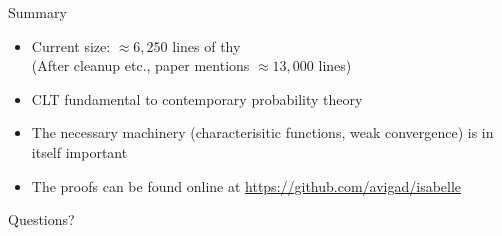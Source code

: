 \documentclass[usepdftitle=false]{beamer}
\begin{document}
\begin{frame}{Summary} %
\begin{itemize}

\item Current size: $\approx 6,250$ lines of thy\\
  (After cleanup etc., paper mentions $\approx 13,000$ lines)

\pause

\item CLT fundamental to contemporary probability theory

\pause

\item The necessary machinery (characterisitic functions, weak convergence) is in itself important

\item The proofs can be found online at \url{https://github.com/avigad/isabelle}

\end{itemize}


\begin{center} \LARGE Questions? \end{center}

\end{frame} %
\end{document}
